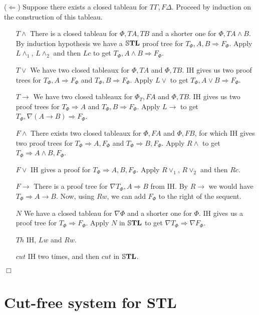 \documentclass[a4paper, 12pt]{paper}
\begin{document}
($\Leftarrow$) Suppose there exists a closed tableau for $T \Gamma, F \Delta$. Proceed by induction on the construction of this tableau.

\begin{enumerate}
  \item[$T \wedge$] There is a closed tableau for $\Phi, T A, T B$ and a shorter one for $\Phi, T A \wedge B$. By induction hypothesis we have a $\mathbb{S}\mathbf{TL}$ proof tree for $T_\Phi, A, B \Rightarrow F_\Phi$. Apply $L \wedge_1$, $L \wedge_2$ and then $L c$ to get $T_\Phi, A \wedge B \Rightarrow F_\Phi$.
  \item[$T \vee$] We have two closed tableaux for $\Phi, T A$ and $\Phi, T B$. IH gives us two proof trees for $T_\Phi, A \Rightarrow F_\Phi$ and $T_\Phi, B \Rightarrow F_\Phi$. Apply $L \vee$ to get $T_\Phi, A \vee B \Rightarrow F_\Phi$.
  \item[$T \rightarrow$] We have two closed tableaux for $\Phi_T, F A$ and $\Phi, T B$. IH gives us two proof trees for $T_\Phi \Rightarrow A$ and $T_\Phi, B \Rightarrow F_\Phi$. Apply $L \rightarrow$ to get $T_\Phi, \nabla (A \rightarrow B) \Rightarrow F_\Phi$.
  \item[$F \wedge$] There exists two closed tableaux for $\Phi, F A$ and $\Phi, F B$, for which IH gives two proof trees for $T_\Phi \Rightarrow A, F_\Phi$ and $T_\Phi \Rightarrow B, F_\Phi$. Apply $R \wedge$ to get $T_\Phi \Rightarrow A \wedge B, F_\Phi$.
  \item[$F \vee$] IH gives a proof for $T_\Phi \Rightarrow A, B, F_\Phi$. Apply $R \vee_1$, $R \vee_2$ and then $R c$.
  \item[$F \rightarrow$] There is a proof tree for $\nabla T_\Phi, A \Rightarrow B$ from IH. By $R \rightarrow$ we would have $T_\Phi \Rightarrow A \rightarrow B$. Now, using $R w$, we can add $F_\Phi$ to the right of the sequent.
  \item[$N$] We have a closed tableau for $\nabla \Phi$ and a shorter one for $\Phi$. IH gives us a proof tree for $T_\Phi \Rightarrow F_\Phi$. Apply $N$ in $\mathbb{S}\mathbf{TL}$ to get $\nabla T_\Phi \Rightarrow \nabla F_\Phi$.
  \item[$Th$] IH, $L w$ and $R w$.
  \item[$cut$] IH two times, and then $cut$ in $\mathbb{S}\mathbf{TL}$.
\end{enumerate}
\begin{flushright}$\Box$\end{flushright}


\section{Cut-free system for STL} \quad \\
\end{document}
